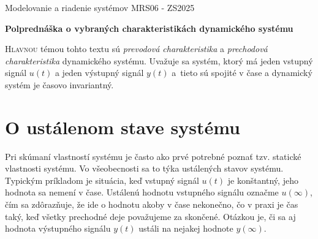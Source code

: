 \documentclass[a4paper, 10pt, ]{article}
\def\oznacenieCasti{MRS06 - ZS2025}
\begin{document}
\lstset{%
style=mystyle,
rangebeginprefix=\#\#\#\ cellB\ ,%
rangebeginsuffix=\ \#\#\#,%
rangeendprefix=\#\#\#\ cellE\ ,%
rangeendsuffix=\ \#\#\#,%
includerangemarker=false,
}





\fontsize{12pt}{22pt}\selectfont

\centerline{\textsf{Modelovanie a riadenie systémov} \hfill \textsf{\oznacenieCasti}}

\fontsize{18pt}{22pt}\selectfont





\begin{flushleft}
	\textbf{\textsf{Polprednáška o vybraných charakteristikách dynamického systému}}
\end{flushleft}





\normalsize

\bigskip

{\hypersetup{hidelinks}

\tableofcontents

}

\bigskip

\vspace{18pt}



\noindent
\lettrine[lines=3, nindent=0pt]{H}{lavnou} témou tohto textu sú \emph{prevodová charakteristika} a \emph{prechodová charakteristika} dynamického systému. Uvažuje sa systém, ktorý má jeden vstupný signál $u(t)$ a jeden výstupný signál $y(t)$ a~tieto sú spojité v čase a dynamický systém je časovo invariantný.





\section{O ustálenom stave systému}

Pri skúmaní vlastností systému je často ako prvé potrebné poznať tzv. statické vlastnosti systému. Vo všeobecnosti sa to týka ustálených stavov systému. Typickým príkladom je situácia, keď vstupný signál $u(t)$ je konštantný, jeho hodnota sa nemení v čase. Ustálenú hodnotu vstupného signálu označme $u(\infty)$, čím sa zdôrazňuje, že ide o hodnotu akoby v čase nekonečno, čo v praxi je čas taký, keď všetky prechodné deje považujeme za skončené. Otázkou je, či sa aj hodnota výstupného signálu $y(t)$ ustáli na nejakej hodnote $y(\infty)$. 
\end{document}
